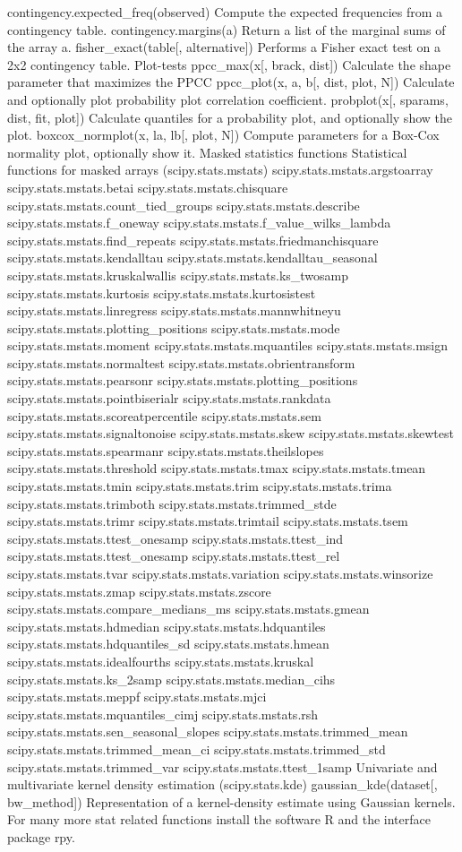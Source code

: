 contingency.expected_freq(observed)	Compute the expected frequencies from a contingency table.
contingency.margins(a)	Return a list of the marginal sums of the array a.
fisher_exact(table[, alternative])	Performs a Fisher exact test on a 2x2 contingency table.
Plot-tests
ppcc_max(x[, brack, dist])	Calculate the shape parameter that maximizes the PPCC
ppcc_plot(x, a, b[, dist, plot, N])	Calculate and optionally plot probability plot correlation coefficient.
probplot(x[, sparams, dist, fit, plot])	Calculate quantiles for a probability plot, and optionally show the plot.
boxcox_normplot(x, la, lb[, plot, N])	Compute parameters for a Box-Cox normality plot, optionally show it.
Masked statistics functions
Statistical functions for masked arrays (scipy.stats.mstats)
scipy.stats.mstats.argstoarray
scipy.stats.mstats.betai
scipy.stats.mstats.chisquare
scipy.stats.mstats.count_tied_groups
scipy.stats.mstats.describe
scipy.stats.mstats.f_oneway
scipy.stats.mstats.f_value_wilks_lambda
scipy.stats.mstats.find_repeats
scipy.stats.mstats.friedmanchisquare
scipy.stats.mstats.kendalltau
scipy.stats.mstats.kendalltau_seasonal
scipy.stats.mstats.kruskalwallis
scipy.stats.mstats.ks_twosamp
scipy.stats.mstats.kurtosis
scipy.stats.mstats.kurtosistest
scipy.stats.mstats.linregress
scipy.stats.mstats.mannwhitneyu
scipy.stats.mstats.plotting_positions
scipy.stats.mstats.mode
scipy.stats.mstats.moment
scipy.stats.mstats.mquantiles
scipy.stats.mstats.msign
scipy.stats.mstats.normaltest
scipy.stats.mstats.obrientransform
scipy.stats.mstats.pearsonr
scipy.stats.mstats.plotting_positions
scipy.stats.mstats.pointbiserialr
scipy.stats.mstats.rankdata
scipy.stats.mstats.scoreatpercentile
scipy.stats.mstats.sem
scipy.stats.mstats.signaltonoise
scipy.stats.mstats.skew
scipy.stats.mstats.skewtest
scipy.stats.mstats.spearmanr
scipy.stats.mstats.theilslopes
scipy.stats.mstats.threshold
scipy.stats.mstats.tmax
scipy.stats.mstats.tmean
scipy.stats.mstats.tmin
scipy.stats.mstats.trim
scipy.stats.mstats.trima
scipy.stats.mstats.trimboth
scipy.stats.mstats.trimmed_stde
scipy.stats.mstats.trimr
scipy.stats.mstats.trimtail
scipy.stats.mstats.tsem
scipy.stats.mstats.ttest_onesamp
scipy.stats.mstats.ttest_ind
scipy.stats.mstats.ttest_onesamp
scipy.stats.mstats.ttest_rel
scipy.stats.mstats.tvar
scipy.stats.mstats.variation
scipy.stats.mstats.winsorize
scipy.stats.mstats.zmap
scipy.stats.mstats.zscore
scipy.stats.mstats.compare_medians_ms
scipy.stats.mstats.gmean
scipy.stats.mstats.hdmedian
scipy.stats.mstats.hdquantiles
scipy.stats.mstats.hdquantiles_sd
scipy.stats.mstats.hmean
scipy.stats.mstats.idealfourths
scipy.stats.mstats.kruskal
scipy.stats.mstats.ks_2samp
scipy.stats.mstats.median_cihs
scipy.stats.mstats.meppf
scipy.stats.mstats.mjci
scipy.stats.mstats.mquantiles_cimj
scipy.stats.mstats.rsh
scipy.stats.mstats.sen_seasonal_slopes
scipy.stats.mstats.trimmed_mean
scipy.stats.mstats.trimmed_mean_ci
scipy.stats.mstats.trimmed_std
scipy.stats.mstats.trimmed_var
scipy.stats.mstats.ttest_1samp
Univariate and multivariate kernel density estimation (scipy.stats.kde)
gaussian_kde(dataset[, bw_method])	Representation of a kernel-density estimate using Gaussian kernels.
For many more stat related functions install the software R and the interface package rpy.

